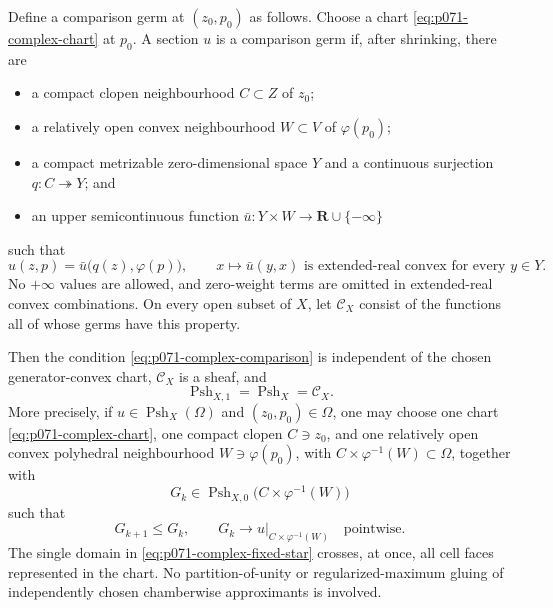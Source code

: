 Define a comparison germ at \((z_0,p_0)\) as follows.  Choose a chart
\eqref{eq:p071-complex-chart} at \(p_0\).  A section \(u\) is a comparison
germ if, after shrinking, there are
\begin{itemize}
\item a compact clopen neighbourhood \(C\subset Z\) of \(z_0\);
\item a relatively open convex neighbourhood \(W\subset V\) of
  \(\varphi(p_0)\);
\item a compact metrizable zero-dimensional space \(Y\) and a continuous
  surjection \(q:C\twoheadrightarrow Y\); and
\item an upper semicontinuous function
  \(\bar u:Y\times W\to\mathbf R\cup\{-\infty\}\)
\end{itemize}
such that
\begin{equation}
 u(z,p)=\bar u\bigl(q(z),\varphi(p)\bigr),
 \qquad
 x\longmapsto\bar u(y,x)
 \text{ is extended-real convex for every }y\in Y.
 \label{eq:p071-complex-comparison}
\end{equation}
No \(+\infty\) values are allowed, and zero-weight terms are omitted in
extended-real convex combinations.  On every open subset of \(X\), let
\(\mathscr C_X\) consist of the functions all of whose germs have this
property.

Then the condition \eqref{eq:p071-complex-comparison} is independent of the
chosen generator-convex chart, \(\mathscr C_X\) is a sheaf, and
\begin{equation}
              \operatorname{Psh}_{X,1}
              =\operatorname{Psh}_X
              =\mathscr C_X.
 \label{eq:p071-complex-collapse}
\end{equation}
More precisely, if \(u\in\operatorname{Psh}_X(\Omega)\) and
\((z_0,p_0)\in\Omega\), one may choose one chart
\eqref{eq:p071-complex-chart}, one compact clopen \(C\ni z_0\), and one
relatively open convex polyhedral neighbourhood
\(W\ni\varphi(p_0)\), with
\(C\times\varphi^{-1}(W)\subset\Omega\), together with
\[
 G_k\in\operatorname{Psh}_{X,0}
       \bigl(C\times\varphi^{-1}(W)\bigr)
\]
such that
\begin{equation}
                 G_{k+1}\leq G_k,
 \qquad          G_k\longrightarrow
                 u|_{C\times\varphi^{-1}(W)}
                 \quad\text{pointwise}.
 \label{eq:p071-complex-fixed-star}
\end{equation}
The single domain in \eqref{eq:p071-complex-fixed-star} crosses, at once,
all cell faces represented in the chart.  No partition-of-unity or
regularized-maximum gluing of independently chosen chamberwise
approximants is involved.

